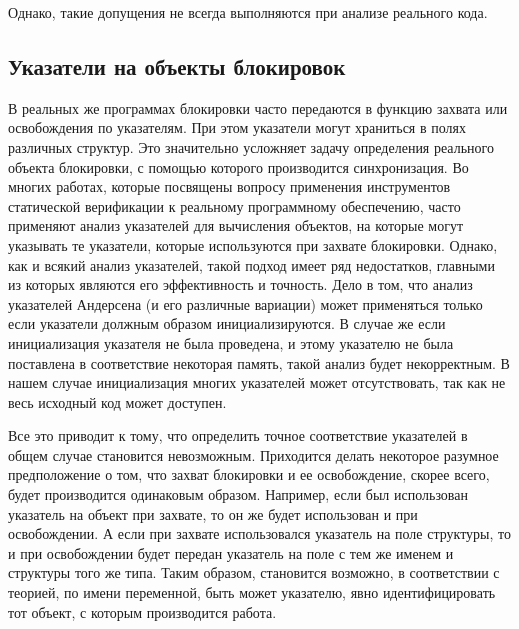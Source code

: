 Однако, такие допущения не всегда выполняются при анализе реального кода. 

\subsection{Указатели на объекты блокировок}
В реальных же программах блокировки часто передаются в функцию захвата или освобождения по указателям.
При этом указатели могут храниться в полях различных структур.
Это значительно усложняет задачу определения реального объекта блокировки, с помощью которого производится синхронизация.
Во многих работах, которые посвящены вопросу применения инструментов статической верификации к реальному программному обеспечению, часто применяют анализ указателей для вычисления объектов, на которые могут указывать те указатели, которые используются при захвате блокировки.
Однако, как и всякий анализ указателей, такой подход имеет ряд недостатков, главными из которых являются его эффективность и точность.
Дело в том, что анализ указателей Андерсена (и его различные вариации) может применяться только если указатели должным образом инициализируются.
В случае же если инициализация указателя не была проведена, и этому указателю не была поставлена в соответствие некоторая память, такой анализ будет некорректным.
В нашем случае инициализация многих указателей может отсутствовать, так как не весь исходный код может доступен.

Все это приводит к тому, что определить точное соответствие указателей в общем случае становится невозможным.
Приходится делать некоторое разумное предположение о том, что захват блокировки и ее освобождение, скорее всего, будет производится одинаковым образом.
Например, если был использован указатель на объект при захвате, то он же будет использован и при освобождении.
А если при захвате использовался указатель на поле структуры, то и при освобождении будет передан указатель на поле с тем же именем и структуры того же типа.
Таким образом, становится возможно, в соответствии с теорией, по имени переменной, быть может указателю, явно идентифицировать тот объект, с которым производится работа.

